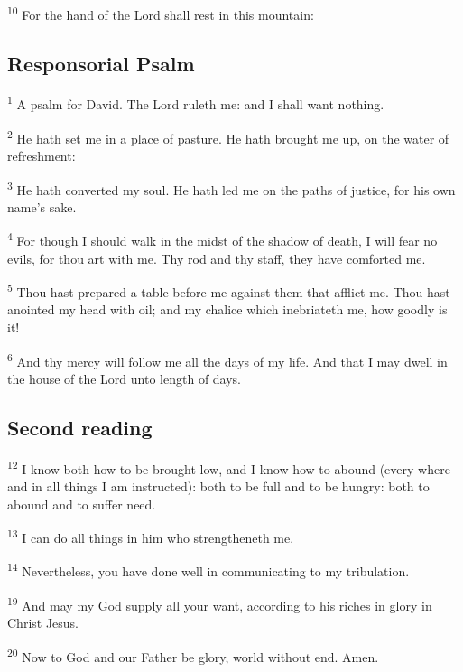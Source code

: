 \textsuperscript{10} For the hand of the Lord shall rest in this mountain:

\subsection{Responsorial Psalm}
\label{proper-psalm}

\textsuperscript{1} A psalm for David. The Lord ruleth me: and I shall want nothing.

\textsuperscript{2} He hath set me in a place of pasture. He hath brought me up, on the water of refreshment:

\textsuperscript{3} He hath converted my soul. He hath led me on the paths of justice, for his own name’s sake.

\textsuperscript{4} For though I should walk in the midst of the shadow of death, I will fear no evils, for thou art with me. Thy rod and thy staff, they have comforted me.

\textsuperscript{5} Thou hast prepared a table before me against them that afflict me. Thou hast anointed my head with oil; and my chalice which inebriateth me, how goodly is it!

\textsuperscript{6} And thy mercy will follow me all the days of my life. And that I may dwell in the house of the Lord unto length of days.

\subsection{Second reading}
\label{proper-second-reading}

\textsuperscript{12} I know both how to be brought low, and I know how to abound (every where and in all things I am instructed): both to be full and to be hungry: both to abound and to suffer need.

\textsuperscript{13} I can do all things in him who strengtheneth me.

\textsuperscript{14} Nevertheless, you have done well in communicating to my tribulation.


\textsuperscript{19} And may my God supply all your want, according to his riches in glory in Christ Jesus.

\textsuperscript{20} Now to God and our Father be glory, world without end. Amen.

